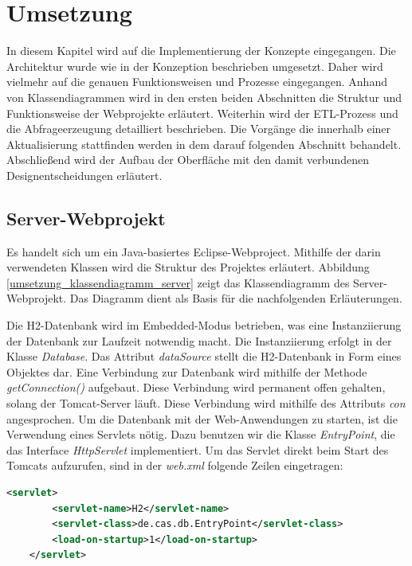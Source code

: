 

\chapter{Umsetzung}
\label{ch:umsetzung}

In diesem Kapitel wird auf die Implementierung der Konzepte eingegangen. Die Architektur wurde wie in der Konzeption beschrieben umgesetzt. Daher wird vielmehr auf die genauen Funktionsweisen und Prozesse eingegangen. Anhand von Klassendiagrammen wird in den ersten beiden Abschnitten die Struktur und Funktionsweise der Webprojekte erläutert. Weiterhin wird der ETL-Prozess und die Abfrageerzeugung detailliert beschrieben. Die Vorgänge die innerhalb einer Aktualisierung stattfinden werden in dem darauf folgenden Abschnitt behandelt. Abschließend wird der Aufbau der Oberfläche mit den damit verbundenen Designentscheidungen erläutert. 

\section{Server-Webprojekt}

Es handelt sich um ein Java-basiertes Eclipse-Webproject. Mithilfe der darin verwendeten Klassen wird die Struktur des Projektes erläutert. Abbildung \ref{umsetzung_klassendiagramm_server} zeigt das Klassendiagramm des Server-Webprojekt. Das Diagramm dient als Basis für die nachfolgenden Erläuterungen. 

Die H2-Datenbank wird im Embedded-Modus betrieben, was eine Instanziierung der Datenbank zur Laufzeit notwendig macht. Die Instanziierung erfolgt in der Klasse \textit{Database}. Das Attribut \textit{dataSource} stellt die H2-Datenbank in Form eines Objektes dar. Eine Verbindung zur Datenbank wird mithilfe der Methode \textit{getConnection()} aufgebaut. Diese Verbindung wird permanent offen gehalten, solang der Tomcat-Server läuft. Diese Verbindung wird mithilfe des Attributs \textit{con} angesprochen. Um die Datenbank mit der Web-Anwendungen zu starten, ist die Verwendung eines Servlets nötig. Dazu benutzen wir die Klasse \textit{EntryPoint}, die das Interface \textit{HttpServlet} implementiert. Um das Servlet direkt beim Start des Tomcats aufzurufen, sind in der \textit{web.xml} folgende Zeilen eingetragen: 

\begin{lstlisting}[language=XML]
	<servlet>
		<servlet-name>H2</servlet-name>
		<servlet-class>de.cas.db.EntryPoint</servlet-class>
		<load-on-startup>1</load-on-startup>
	</servlet>
\end{lstlisting}

